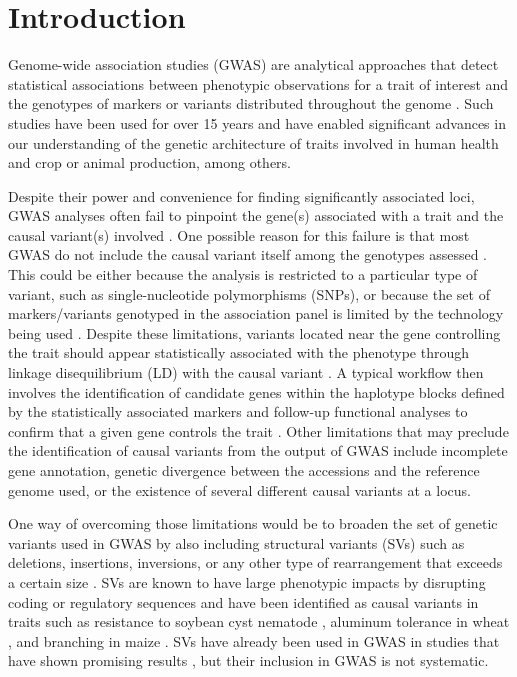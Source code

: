 \section{Introduction}
\label{sv-gwas-introduction}

Genome-wide association studies (GWAS) are analytical approaches that detect
statistical associations between phenotypic observations for a trait of
interest and the genotypes of markers or variants distributed throughout the
genome \citep{tam2019}.  Such studies have been used for over 15 years
\citep{visscher2012} and have enabled significant advances in our understanding
of the genetic architecture of traits involved in human health
\citep[e.g.][]{wellcome2007gwas} and crop \citep{tibbs2021} or animal
\citep{ma2019} production, among others.

Despite their power and convenience for finding significantly associated loci,
GWAS analyses often fail to pinpoint the gene(s) associated with a trait and
the causal variant(s) involved \citep{tam2019}.  One possible reason for this
failure is that most GWAS do not include the causal variant itself among the
genotypes assessed \citep{tibbs2021}. This could be either because the analysis
is restricted to a particular type of variant, such as single-nucleotide
polymorphisms (SNPs), or because the set of markers/variants genotyped in the
association panel is limited by the technology being used
\citep[e.g.][]{bandillo2015, sonah2015}.  Despite these limitations, variants
located near the gene controlling the trait should appear statistically
associated with the phenotype through linkage disequilibrium (LD) with the
causal variant \citep{korte2013}.  A typical workflow then involves the
identification of candidate genes within the haplotype blocks defined by the
statistically associated markers and follow-up functional analyses to confirm
that a given gene controls the trait \citep[e.g.][]{wang2018, liu2020ps}.
Other limitations that may preclude the identification of causal variants from
the output of GWAS include incomplete gene annotation, genetic divergence
between the accessions and the reference genome used, or the existence of
several different causal variants at a locus.

One way of overcoming those limitations would be to broaden the set of genetic
variants used in GWAS by also including structural variants (SVs) such as
deletions, insertions, inversions, or any other type of rearrangement that
exceeds a certain size \cite[typically 50 bp; ][]{ho2020}.  SVs are known to
have large phenotypic impacts by disrupting coding or regulatory sequences
\citep{marroni2014} and have been identified as causal variants in traits such
as resistance to soybean cyst nematode \citep{cook2012}, aluminum tolerance in
wheat \citep{maron2013}, and branching in maize \citep{studer2011}.  SVs have
already been used in GWAS in studies that have shown promising results
\citep[e.g.][]{zhang2015, akakpo2020, dominguez2020, liu2020-pangenome}, but
their inclusion in GWAS is not systematic.

